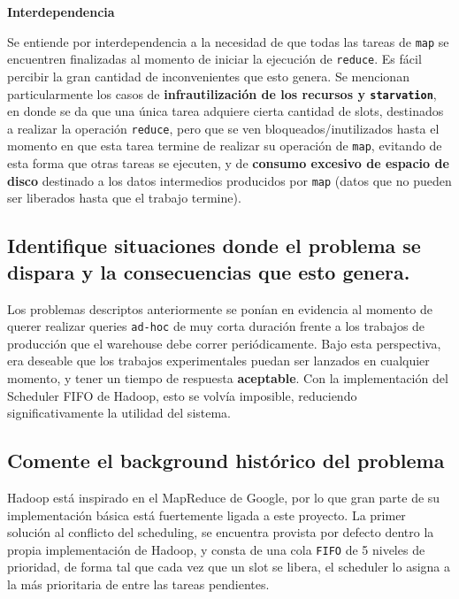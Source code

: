 \documentclass[11pt, a4paper, twoside]{article}
\begin{document}
\begin{center}
\textbf{Interdependencia}
\end{center}
Se entiende por interdependencia a la necesidad de que todas las tareas de
\texttt{map} se encuentren finalizadas al momento de iniciar la ejecución de
\texttt{reduce}. Es fácil percibir la gran cantidad de inconvenientes que esto
genera. Se mencionan particularmente los casos de \textbf{infrautilización de
los recursos y \texttt{starvation}}, en donde se da que una única tarea adquiere
cierta cantidad de slots, destinados a realizar la operación \texttt{reduce},
pero que se ven bloqueados/inutilizados hasta el momento en que esta tarea
termine de realizar su operación de \texttt{map}, evitando de esta forma que
otras tareas se ejecuten, y de \textbf{consumo excesivo de espacio de disco}
destinado a los datos intermedios producidos por \texttt{map} (datos que no
pueden ser liberados hasta que el trabajo termine).

\clearpage
\subsection {\footnotesize Identifique situaciones donde el problema se dispara y la consecuencias que esto genera.}
\label{investigacion-3}

Los problemas descriptos anteriormente se ponían en evidencia al momento de
querer realizar queries \texttt{ad-hoc} de muy corta duración frente a los
trabajos de producción que el warehouse debe correr periódicamente. Bajo esta
perspectiva, era deseable que los trabajos experimentales puedan ser lanzados
en cualquier momento, y tener un tiempo de respuesta \textbf{aceptable}. Con
la implementación del Scheduler FIFO de Hadoop, esto se volvía imposible,
reduciendo significativamente la utilidad del sistema.

\clearpage

\subsection {\footnotesize Comente el background histórico del problema}
\label{investigacion-4}
Hadoop está inspirado en el MapReduce de Google, por lo que gran parte de su
implementación básica está fuertemente ligada a este proyecto. La primer
solución al conflicto del scheduling, se encuentra provista por defecto dentro
la propia implementación de Hadoop, y consta de una cola \texttt{FIFO} de 5
niveles de prioridad, de forma tal que cada vez que un slot se libera, el
scheduler lo asigna a la más prioritaria de entre las tareas pendientes.
\end{document}

